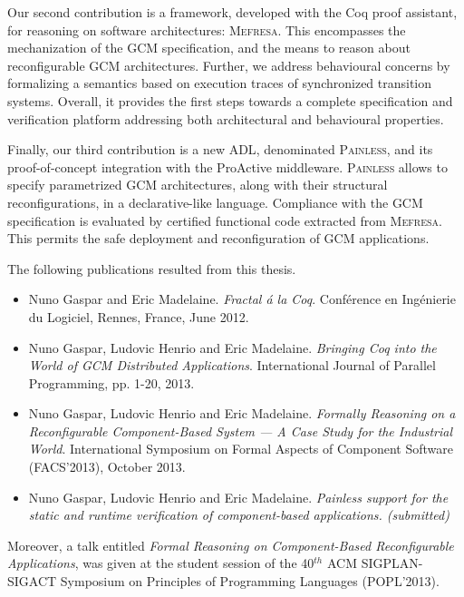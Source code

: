 	Our second contribution is a framework, developed with the Coq proof assistant,
	for reasoning on software architectures: \textsc{Mefresa}. This encompasses
	the mechanization of the \ac{GCM} specification, and the means to
	reason about reconfigurable \ac{GCM} architectures. Further, we address
	behavioural concerns by formalizing a semantics based on execution traces of
	synchronized transition systems.
	Overall, it provides the first steps towards a complete specification and verification
	platform addressing both architectural and behavioural properties.
						
	Finally, our third contribution is a new \ac{ADL}, denominated \textsc{Painless},
	and its proof-of-concept integration with the ProActive middleware. 
	\textsc{Painless} allows to specify parametrized \ac{GCM} architectures, along with
	their structural reconfigurations, in a declarative-like language. Compliance
	with the \ac{GCM} specification is evaluated by certified	 functional code extracted from
	\textsc{Mefresa}. This permits the safe deployment and
	reconfiguration of \ac{GCM} applications.
			
	The following publications resulted from this thesis.
	
	\begin{itemize}
		\item Nuno Gaspar and Eric Madelaine. \textit{Fractal \'a la Coq}.
		Conf\'erence en Ing\'enierie du Logiciel, Rennes, France, June 2012.
		
		\item Nuno Gaspar, Ludovic Henrio and Eric Madelaine. 
		\textit{Bringing Coq into the World of GCM Distributed Applications}.
		International Journal of Parallel Programming, pp. 1-20, 2013.
		
		\item Nuno Gaspar, Ludovic Henrio and Eric Madelaine.
		\textit{Formally Reasoning on a Reconfigurable Component-Based 
		System --- A Case Study for the Industrial World}.
		International Symposium on Formal Aspects of Component 
		Software (FACS'2013), October 2013.  
		
	\item  Nuno Gaspar, Ludovic Henrio and Eric Madelaine.
	\textit{Painless support for the static and runtime verification of component-based applications. 
	(submitted)}		
		
	\end{itemize}


	Moreover, a talk
	entitled \textit{Formal Reasoning on Component-Based Reconfigurable Applications},
	was given at the student session of the 40$^{th}$ ACM SIGPLAN-SIGACT Symposium on 
	Principles of Programming Languages (POPL'2013).



